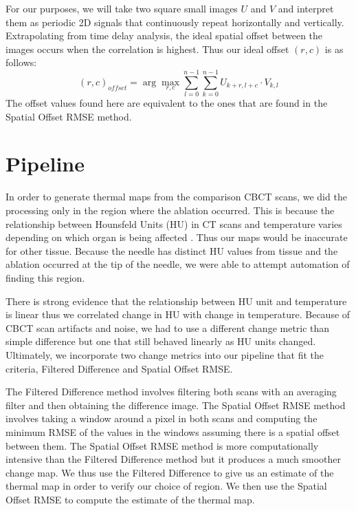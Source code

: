 \documentclass[]{spie}  %
\begin{document}
For our purposes, we will take two square small images $U$ and $V$ and interpret them as periodic 2D signals that continuously repeat horizontally and vertically. Extrapolating from time delay analysis, the ideal spatial offset between the images occurs when the correlation is highest. Thus our ideal offset $(r,c)$ is as follows:
\[
(r,c)_{offset} = \arg\max_{r,c} \sum_{l=0}^{n-1} \sum_{k=0}^{n-1} {U_{k+r,l+c} \cdot V_{k,l}}
\]
The offset values found here are equivalent to the ones that are found in the Spatial Offset RMSE method. 

\section{Pipeline}

In order to generate thermal maps from the comparison CBCT scans, we did the processing only in the region where the ablation occurred. This is because the relationship between Hounsfeld Units (HU) in CT scans and temperature varies depending on which organ is being affected \cite{Fani14}. Thus our maps would be inaccurate for other tissue. Because the needle has distinct HU values from tissue and the ablation occurred at the tip of the needle, we were able to attempt automation of finding this region.

There is strong evidence that the relationship between HU unit and temperature is linear \cite{Fani14} thus we correlated change in HU with change in temperature. Because of CBCT scan artifacts and noise, we had to use a different change metric than simple difference but one that still behaved linearly as HU units changed. Ultimately, we incorporate two change metrics into our pipeline that fit the criteria, Filtered Difference and Spatial Offset RMSE.  

The Filtered Difference method involves filtering both scans with an averaging filter and then obtaining the difference image. The Spatial Offset RMSE method involves taking a window around a pixel in both scans and computing the minimum RMSE of the values in the windows assuming there is a spatial offset between them. The Spatial Offset RMSE method is more computationally intensive than the Filtered Difference method but it produces a much smoother change map. We thus use the Filtered Difference to give us an estimate of the thermal map in order to verify our choice of region. We then use the Spatial Offset RMSE to compute the estimate of the thermal map. 
\end{document}

